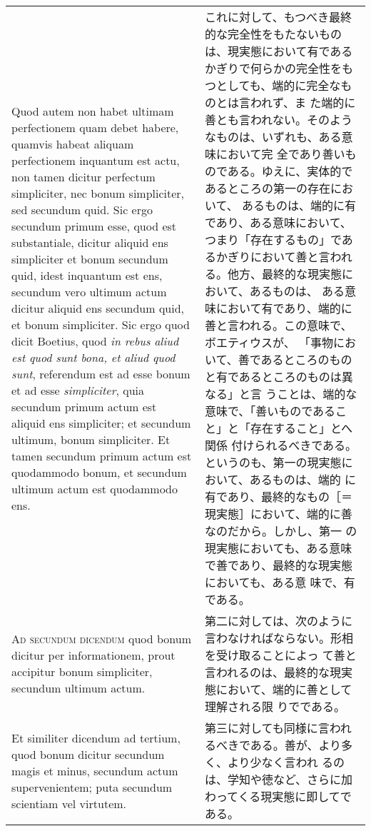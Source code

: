 \documentclass[10pt]{jsarticle}
\begin{document}
\begin{longtable}{p{21em}p{21em}}
\\


Quod autem non habet ultimam perfectionem quam debet habere, quamvis
 habeat aliquam perfectionem inquantum est actu, non tamen dicitur
 perfectum simpliciter, nec bonum simpliciter, sed secundum quid.  Sic
 ergo secundum primum esse, quod est substantiale, dicitur aliquid ens
 simpliciter et bonum secundum quid, idest inquantum est ens, secundum
 vero ultimum actum dicitur aliquid ens secundum quid, et bonum
 simpliciter.  Sic ergo quod dicit Boetius, quod {\itshape in rebus
 aliud est quod sunt bona, et aliud quod sunt}, referendum est ad esse
 bonum et ad esse {\itshape simpliciter}, quia secundum primum actum est
 aliquid ens simpliciter; et secundum ultimum, bonum simpliciter. Et
 tamen secundum primum actum est quodammodo bonum, et secundum ultimum
 actum est quodammodo ens.

&

これに対して、もつべき最終的な完全性をもたないものは、現実態において有である
 かぎりで何らかの完全性をもつとしても、端的に完全なものとは言われず、ま
 た端的に善とも言われない。そのようなものは、いずれも、ある意味において完
 全であり善いものである。ゆえに、実体的であるところの第一の存在において、
 あるものは、端的に有であり、ある意味において、つまり「存在するもの」であ
 るかぎりにおいて善と言われる。他方、最終的な現実態において、あるものは、
 ある意味において有であり、端的に善と言われる。この意味で、ボエティウスが、
 「事物において、善であるところのものと有であるところのものは異なる」と言
 うことは、端的な意味で、「善いものであること」と「存在すること」とへ関係
 付けられるべきである。というのも、第一の現実態において、あるものは、端的
 に有であり、最終的なもの［＝現実態］において、端的に善なのだから。しかし、第一
 の現実態においても、ある意味で善であり、最終的な現実態においても、ある意
 味で、有である。

\\



{\scshape Ad secundum dicendum} quod bonum dicitur per informationem,
 prout accipitur bonum simpliciter, secundum ultimum actum.


&

第二に対しては、次のように言わなければならない。形相を受け取ることによっ
 て善と言われるのは、最終的な現実態において、端的に善として理解される限
 りでである。

\\

Et similiter dicendum ad tertium, quod bonum dicitur secundum magis et
 minus, secundum actum supervenientem; puta secundum scientiam vel
 virtutem.

&

第三に対しても同様に言われるべきである。善が、より多く、より少なく言われ
 るのは、学知や徳など、さらに加わってくる現実態に即してである。


 

\end{longtable}
\end{document}
